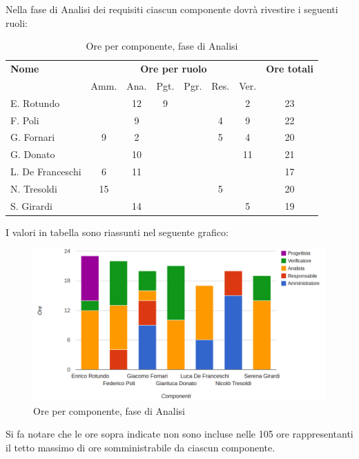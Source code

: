 Nella fase di Analisi dei requisiti ciascun componente dovrà rivestire i seguenti ruoli:
\noindent
\begin{table}[H]
\begin{tabular}{lccccccc}
\toprule
    \textbf{Nome}  & \multicolumn{6}{c}{\textbf{Ore per ruolo}} & \textbf{Ore totali} \\
     & Amm. & Ana. & Pgt. & Pgr. & Res. & Ver. & \\
    \midrule
    
    E. Rotundo 		&   & 12 & 9 &  &  & 2 & 23 \\
    F. Poli 		&   & 9 &  &  & 4 & 9 & 22 \\
    G. Fornari		& 9 & 2 & 	&  & 5 & 4 & 20 \\
    G. Donato 		&   & 10 &  &  &  & 11 & 21 \\
    L. De Franceschi  & 6 & 11 &  &  &  &  & 17 \\
    N. Tresoldi 		& 15&  &  &  & 5 &  & 20 \\
   	S. Girardi 		&   & 14 &  &  &  & 5 & 19 \\
    
    \bottomrule
\end{tabular}
\caption{Ore per componente, fase di Analisi}
\end{table}

I valori in tabella sono riassunti nel seguente grafico: \\ 

\begin{figure}[H]
\centering
\includegraphics[scale=0.35]{4-1.png}
\caption{Ore per componente, fase di Analisi\label{fig:nome}}
\end{figure}

Si fa notare che le ore sopra indicate non sono incluse nelle 105 ore rappresentanti il tetto massimo di ore somministrabile da ciascun componente.


